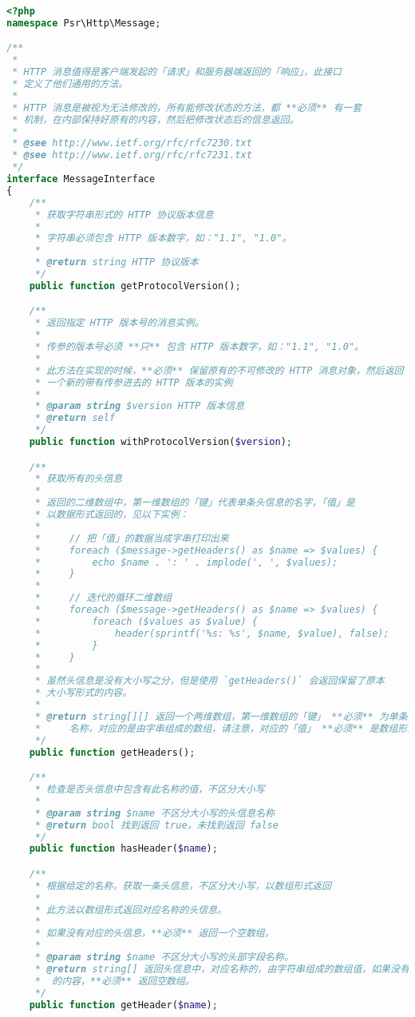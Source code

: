 \begin{lstlisting}[language=PHP]
<?php
namespace Psr\Http\Message;

/**
 * 
 * HTTP 消息值得是客户端发起的「请求」和服务器端返回的「响应」，此接口
 * 定义了他们通用的方法。
 * 
 * HTTP 消息是被视为无法修改的，所有能修改状态的方法，都 **必须** 有一套
 * 机制，在内部保持好原有的内容，然后把修改状态后的信息返回。
 *
 * @see http://www.ietf.org/rfc/rfc7230.txt
 * @see http://www.ietf.org/rfc/rfc7231.txt
 */
interface MessageInterface
{
    /**
     * 获取字符串形式的 HTTP 协议版本信息
     *
     * 字符串必须包含 HTTP 版本数字，如："1.1", "1.0"。
     *
     * @return string HTTP 协议版本
     */
    public function getProtocolVersion();

    /**
     * 返回指定 HTTP 版本号的消息实例。
     *
     * 传参的版本号必须 **只** 包含 HTTP 版本数字，如："1.1", "1.0"。
     *
     * 此方法在实现的时候，**必须** 保留原有的不可修改的 HTTP 消息对象，然后返回
     * 一个新的带有传参进去的 HTTP 版本的实例
     *
     * @param string $version HTTP 版本信息
     * @return self
     */
    public function withProtocolVersion($version);

    /**
     * 获取所有的头信息
     *
     * 返回的二维数组中，第一维数组的「键」代表单条头信息的名字，「值」是
     * 以数据形式返回的，见以下实例：
     *
     *     // 把「值」的数据当成字串打印出来
     *     foreach ($message->getHeaders() as $name => $values) {
     *         echo $name . ': ' . implode(', ', $values);
     *     }
     *
     *     // 迭代的循环二维数组
     *     foreach ($message->getHeaders() as $name => $values) {
     *         foreach ($values as $value) {
     *             header(sprintf('%s: %s', $name, $value), false);
     *         }
     *     }
     *
     * 虽然头信息是没有大小写之分，但是使用 `getHeaders()` 会返回保留了原本
     * 大小写形式的内容。
     *
     * @return string[][] 返回一个两维数组，第一维数组的「键」 **必须** 为单条头信息的
     *     名称，对应的是由字串组成的数组，请注意，对应的「值」 **必须** 是数组形式的。
     */
    public function getHeaders();

    /**
     * 检查是否头信息中包含有此名称的值，不区分大小写
     *
     * @param string $name 不区分大小写的头信息名称
     * @return bool 找到返回 true，未找到返回 false
     */
    public function hasHeader($name);

    /**
     * 根据给定的名称，获取一条头信息，不区分大小写，以数组形式返回
     *
     * 此方法以数组形式返回对应名称的头信息。
     *
     * 如果没有对应的头信息，**必须** 返回一个空数组。
     *
     * @param string $name 不区分大小写的头部字段名称。
     * @return string[] 返回头信息中，对应名称的，由字符串组成的数组值，如果没有对应
     *  的内容，**必须** 返回空数组。
     */
    public function getHeader($name);


\end{lstlisting}
